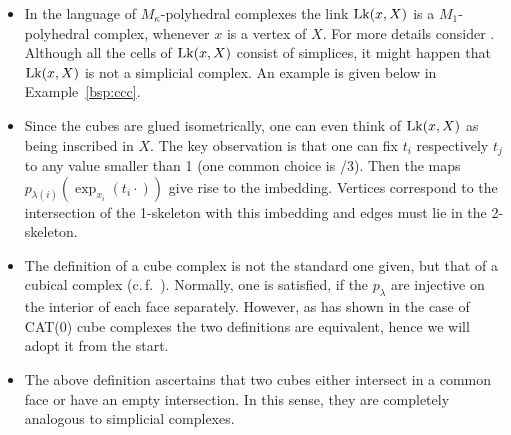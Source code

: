 \begin{rem}
  \label{rem:complex}
  \begin{itemize}
  \item In the language of \(M_\kappa\)-polyhedral complexes the link \(\operatorname{Lk}(x, X)\) is a \(M_1\)-polyhedral complex, whenever \(x\) is a vertex of \(X\). For more details consider \textcite[Section~I.7]{MR1744486}. Although all the cells of \(\operatorname{Lk}(x,X)\) consist of simplices, it might happen that \(\operatorname{Lk}(x,X)\) is not a simplicial complex. An example is given below in Example~\ref{bsp:ccc}.
  \item Since the cubes are glued isometrically, one can even think of \(\operatorname{Lk}(x,X)\) as being inscribed in \(X\). The key observation is that one can fix \(t_i\) respectively \(t_j\) to any value smaller than 1 (one common choice is {/3}). Then the maps \(p_{\lambda(i)}(\exp_{x_i}(t_i \cdot))\) give rise to the imbedding. Vertices correspond to the intersection of the 1-skeleton with this imbedding and edges must lie in the 2-skeleton.
  \item The definition of a cube complex is not the standard one given, but that of a cubical complex (c.\,f.~\cite[Def.~I.7.37]{MR1744486}). Normally, one is satisfied, if the \(p_\lambda\) are injective on the interior of each face separately. However, as \textcite[Thm.~C.4]{MR3029427} has shown in the case of CAT(0) cube complexes the two definitions are equivalent, hence we will adopt it from the start.
  \item The above definition ascertains that two cubes either intersect in a common face or have an empty intersection. In this sense, they are completely analogous to simplicial complexes. 
  \end{itemize}
\end{rem}





